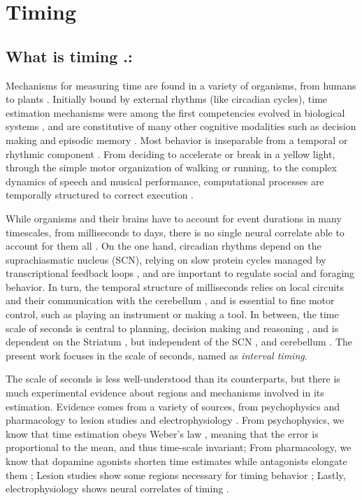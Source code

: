 \chapter{Timing}
\section{What is timing .:}
    
    Mechanisms for measuring time are found in a variety of organisms, from humans to plants \cite{cashmore2003cryptochromes}. Initially bound by external rhythms (like circadian cycles), time estimation mechanisms were among the first competencies evolved in biological systems \cite{paranjpe2005evolution}, and are constitutive of many other cognitive modalities such as decision making and episodic memory \cite{maniadakis2014time}. Most behavior is inseparable from a temporal or rhythmic component \cite{buhusi2005makes}. From deciding to accelerate or break in a yellow light, through the simple motor organization of walking or running, to the complex dynamics of speech and musical performance, computational processes are temporally structured to correct execution \cite{bueti2014temporal}. 
    
    While organisms and their brains have to account for event durations in many timescales, from milliseconds to days, there is no single neural correlate able to account for them all \cite{buhusi2005makes, buhusi2016clocks, hardy2016neurocomputational, lewis2003distinct, mauk2004neural}. On the one hand, circadian rhythms depend on the suprachiasmatic nucleus (SCN), relying on slow protein cycles managed by transcriptional feedback loops \cite{buhusi2005makes}, and are important to regulate social and foraging behavior. In turn, the temporal structure of milliseconds relies on local circuits and their communication with the cerebellum \cite{ohmae2017cerebellar}, and is essential to fine motor control, such as playing an instrument or making a tool. In between, the time scale of seconds is central to planning, decision making and reasoning \cite{buhusi2005makes}, and is dependent on the Striatum \cite{mello2015scalable}, but independent of the SCN \cite{lewis2003interval}, and cerebellum \cite{harrington2004does}. The present work focuses in the scale of seconds, named as \textit{interval timing}.
    
    The scale of seconds is less well-understood than its counterparts, but there is much experimental evidence about regions and mechanisms involved in its estimation. Evidence comes from a variety of sources, from psychophysics \cite{ohmae2017cerebellar} and pharmacology \cite{pine2010dopamine, meck2012gene, drew2003effects, cheng2016clock, ludvig2008stimulus} to lesion studies \cite{} and electrophysiology \cite{bakhurin2017differential}. From psychophysics, we know that time estimation obeys Weber's law \cite{gibbon1977scalar}, meaning that the error is proportional to the mean, and thus time-scale invariant; From pharmacology, we know that dopamine agonists shorten time estimates while antagonists elongate them \cite{}; Lesion studies show some regions necessary for timing behavior \cite{};
    Lastly, electrophysiology shows neural correlates of timing \cite{}.
    
